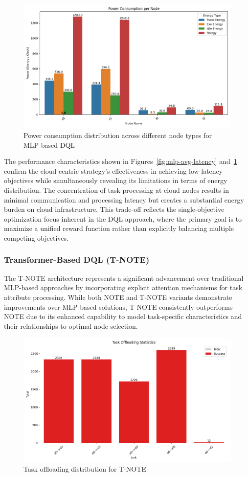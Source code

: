 \documentclass[preprint,3p,authoryear]{elsarticle}
\begin{document}
\begin{figure}[H]
    \centering
    \includegraphics[width=0.5\linewidth]{figs/MLP/power_consumption_per_node.png}
    \caption{Power consumption distribution across different node types for MLP-based DQL}
    \label{fig:mlp-power-consumption}
\end{figure}

The performance characteristics shown in Figures~\ref{fig:mlp-avg-latency} and~\ref{fig:mlp-power-consumption} confirm the cloud-centric strategy's effectiveness in achieving low latency objectives while simultaneously revealing its limitations in terms of energy distribution. The concentration of task processing at cloud nodes results in minimal communication and processing latency but creates a substantial energy burden on cloud infrastructure. This trade-off reflects the single-objective optimization focus inherent in the DQL approach, where the primary goal is to maximize a unified reward function rather than explicitly balancing multiple competing objectives.


\subsubsection{Transformer-Based DQL (T-NOTE)}\label{subsubsec:T-NOTE-analysis}

The T-NOTE architecture represents a significant advancement over traditional MLP-based approaches by incorporating explicit attention mechanisms for task attribute processing. While both NOTE and T-NOTE variants demonstrate improvements over MLP-based solutions, T-NOTE consistently outperforms NOTE due to its enhanced capability to model task-specific characteristics and their relationships to optimal node selection.

\begin{figure}[H]
    \centering
    \includegraphics[width=0.5\linewidth]{figs/T-NOTE/task_offloading_statistics.png}
    \caption{Task offloading distribution for T-NOTE}
    \label{fig:T-NOTE-offloading-stats}
\end{figure}
\end{document}
